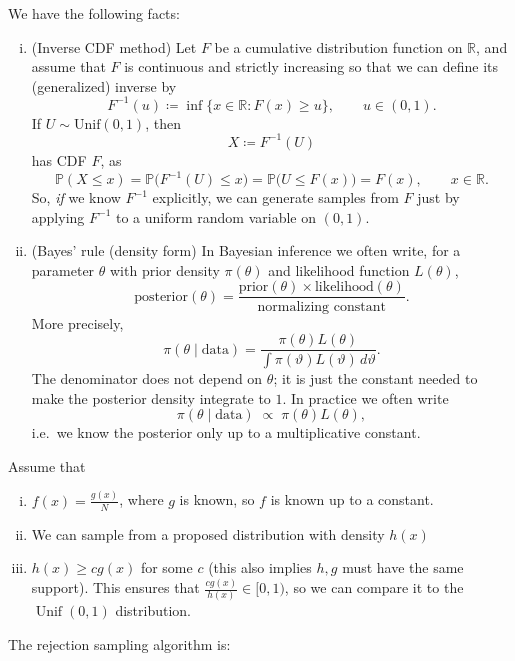 \documentclass{tufte-handout}
\newcommand*\R{\mathbb{R}}
\renewcommand{\P}{\mathbb{P}}
\theoremstyle{definition}
\begin{document}
We have the following facts:
\begin{enumerate}[(i)]
	\item (Inverse CDF method) 
	      Let $F$ be a cumulative distribution function on $\R$, and assume
	      that $F$ is continuous and strictly increasing so that we can define
	      its (generalized) inverse by
	      \[
	      	F^{-1}(u) \coloneqq \inf\{x \in \R : F(x) \ge u\}, \qquad u \in (0,1).
	      \]
	      If $U \sim \mathrm{Unif}(0,1)$, then
	      \[
	      	X \coloneqq F^{-1}(U)
	      \]
	      has CDF $F$, as
	      \[
	      	\P(X \le x)
	      	= \P\!\bigl(F^{-1}(U) \le x\bigr)
	      	= \P\!\bigl(U \le F(x)\bigr)
	      	= F(x), \qquad x \in \R.
	      \]
	      So, \emph{if} we know $F^{-1}$ explicitly, we can generate
	      samples from $F$ just by applying $F^{-1}$ to a uniform random
	      variable on $(0,1)$.

	\item (Bayes' rule (density form) 
	      In Bayesian inference we often write, for a parameter $\theta$
	      with prior density $\pi(\theta)$ and likelihood function
	      $L(\theta)$,
	      \[
	      	\text{posterior}(\theta)
	      	= \frac{\text{prior}(\theta)\times \text{likelihood}(\theta)}
	      	{\text{normalizing constant}}.
	      \]
	      More precisely,
	      \[
	      	\pi(\theta \mid \text{data})
	      	= \frac{\pi(\theta) L(\theta)}
	      	{\displaystyle \int \pi(\vartheta) L(\vartheta) \, d\vartheta}.
	      \]
	      The denominator does not depend on $\theta$; it is just the
	      constant needed to make the posterior density integrate to $1$.
	      In practice we often write
	      \[
	      	\pi(\theta \mid \text{data}) \;\propto\; \pi(\theta) L(\theta),
	      \]
	      i.e.\ we know the posterior only up to a multiplicative constant.
\end{enumerate}

Assume that
\begin{enumerate}[(i)]
	\item $f(x) = \frac{g(x)}{N}$, where $g$ is known, so $f$ is known up to a constant. 
	\item We can sample from a proposed distribution with density $h(x)$
	\item $h(x) \ge cg(x)$ for some $c$ (this also implies $h,g$ must have the same support). This ensures that $\frac{cg(x)}{h(x)} \in [0,1)$, so we can compare it to the $\operatorname{Unif}(0,1)$ distribution.
\end{enumerate}

The rejection sampling algorithm is:
\end{document}

